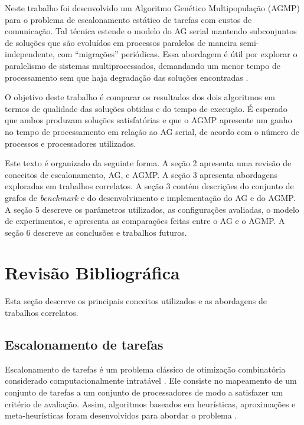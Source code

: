 \documentclass[fleqn,10pt]{SelfArx} %
\begin{document}
Neste trabalho foi desenvolvido um Algoritmo Genético Multipopulação (AGMP) para o problema de escalonamento estático de tarefas com custos de comunicação. Tal técnica estende o modelo do AG serial mantendo subconjuntos de soluções que são evoluídos em processos paralelos de maneira semi-independente, com ``migrações'' periódicas. Essa abordagem é útil por explorar o paralelismo de sistemas multiprocessados, demandando um menor tempo de processamento sem que haja degradação das soluções encontradas \cite{Alba:1999:SPD:315491.315495}.


O objetivo deste trabalho é comparar os resultados dos dois algoritmos em termos de qualidade das soluções obtidas e do tempo de execução. É esperado que ambos produzam soluções satisfatórias e que o AGMP apresente um ganho no tempo de processamento em relação ao AG serial, de acordo com o número de processos e processadores utilizados.

Este texto é organizado da seguinte forma. A seção 2 apresenta uma revisão de conceitos de escalonamento, AG, e AGMP. A seção 3 apresenta abordagens exploradas em trabalhos correlatos. A seção 3 contém descrições do conjunto de grafos de \textit{benchmark} e do desenvolvimento e implementação do AG e do AGMP. A seção 5 descreve os parâmetros utilizados, as configurações avaliadas, o modelo de experimentos, e apresenta as comparações feitas entre o AG e o AGMP. A seção 6 descreve as conclusões e trabalhos futuros.



\section{Revisão Bibliográfica}

Esta seção descreve os principais conceitos utilizados e as abordagens de trabalhos correlatos.

\subsection{Escalonamento de tarefas}
Escalonamento de tarefas é um problema clássico de otimização combinatória considerado computacionalmente intratável \cite{Hou1994}. Ele consiste no mapeamento de um conjunto de tarefas a um conjunto de processadores de modo a satisfazer um critério de avaliação. Assim, algoritmos baseados em heurísticas, aproximações e meta-heurísticas foram desenvolvidos para abordar o problema \cite{Kwok:1999:SSA:344588.344618}.
\end{document}
